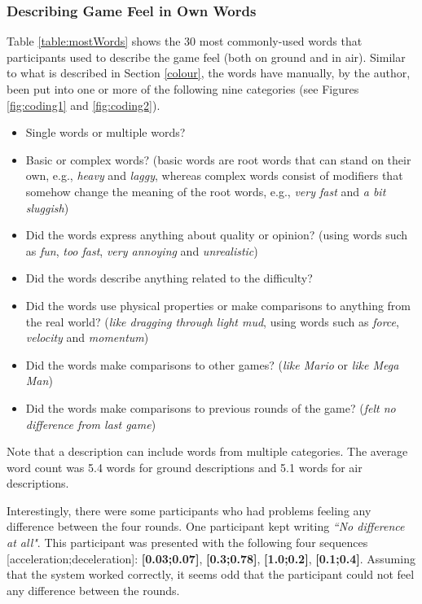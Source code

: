 \subsubsection{Describing Game Feel in Own Words}
Table \ref{table:mostWords} shows the 30 most commonly-used words that participants used to describe the game feel (both on ground and in air). Similar to what is described in Section \ref{colour}, the words have manually, by the author, been put into one or more of the following nine categories (see Figures \ref{fig:coding1} and \ref{fig:coding2}).
\begin{itemize}[noitemsep,nolistsep]
\item Single words or multiple words?
\item Basic or complex words? (basic words are root words that can stand on their own, e.g., \textit{heavy} and \textit{laggy}, whereas complex words consist of modifiers that somehow change the meaning of the root words, e.g., \textit{very fast} and \textit{a bit sluggish})
\item Did the words express anything about quality or opinion? (using words such as \textit{fun}, \textit{too fast}, \textit{very annoying} and \textit{unrealistic})
\item Did the words describe anything related to the difficulty?
\item Did the words use physical properties or make comparisons to anything from the real world? (\textit{like dragging through light mud}, using words such as \textit{force}, \textit{velocity} and \textit{momentum})
\item Did the words make comparisons to other games? (\textit{like Mario} or \textit{like Mega Man})
\item Did the words make comparisons to previous rounds of the game? (\textit{felt no difference from last game})
\end{itemize}

Note that a description can include words from multiple categories. The average word count was 5.4 words for ground descriptions and 5.1 words for air descriptions.

Interestingly, there were some participants who had problems feeling any difference between the four rounds. One participant kept writing \textit{``No difference at all"}. This participant was presented with the following four sequences [acceleration;deceleration]: \textbf{[0.03;0.07]}, \textbf{[0.3;0.78]}, \textbf{[1.0;0.2]}, \textbf{[0.1;0.4]}. Assuming that the system worked correctly, it seems odd that the participant could not feel any difference between the rounds.

